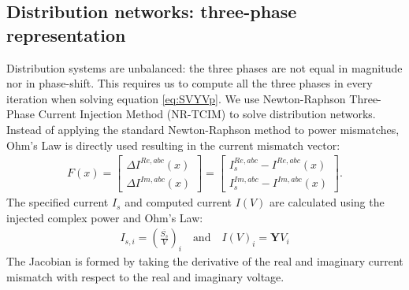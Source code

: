 \documentclass[10pt,journal]{article}
\begin{document}
\subsection{Distribution networks: three-phase representation}
Distribution systems are unbalanced: the three phases are not equal in magnitude nor in phase-shift. This requires us to compute all the three phases in every iteration when solving equation \eqref{eq:SVYVp}. We use Newton-Raphson Three-Phase Current Injection Method (NR-TCIM) \cite{Garcia2000} to solve distribution networks. Instead of applying the standard Newton-Raphson method to power mismatches, Ohm's Law  is directly used resulting in the current mismatch vector: 
\begin{align}
     {F}({x})=\begin{bmatrix}
                \Delta {I}^{Re,abc}({x})\\ 
                \Delta {I}^{Im,abc}({x}) 
               \end{bmatrix}  = \begin{bmatrix}
   {I}_s^{Re,abc} - {I}^{Re,abc}({x}) \\
   {I}_s^{Im,abc} - {I}^{Im,abc}({x})
               \end{bmatrix}.
    \label{eq:curmism}
\end{align}
The specified current ${I_s}$ and computed current ${I}\left({V}\right)$ are calculated using the injected complex power and Ohm's Law: 
\begin{align}
    {I_{s,i}} = \left(\frac{\overline{S_s}}{V}\right)_i\quad\mbox{and}\quad I(V)_i = \mathbf{Y}V_i 
\end{align}
The Jacobian is formed by taking the derivative of the real and imaginary current mismatch with respect to the real and imaginary voltage.
\end{document}
